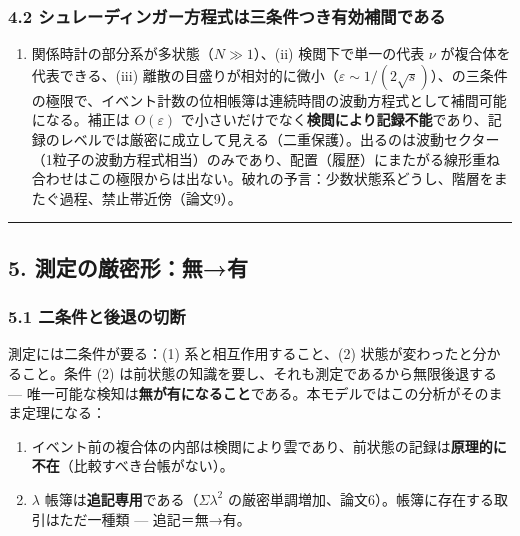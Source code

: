\documentclass[
]{ltjsarticle}
\providecommand{\tightlist}{%
  \setlength{\itemsep}{0pt}\setlength{\parskip}{0pt}}
\begin{document}
\subsubsection{4.2
シュレーディンガー方程式は三条件つき有効補間である}\label{ux30b7ux30e5ux30ecux30fcux30c7ux30a3ux30f3ux30acux30fcux65b9ux7a0bux5f0fux306fux4e09ux6761ux4ef6ux3064ux304dux6709ux52b9ux88dcux9593ux3067ux3042ux308b}

\begin{enumerate}
\def\labelenumi{(\roman{enumi})}
\tightlist
\item
  関係時計の部分系が多状態（\(N\gg1\)）、(ii) 検閲下で単一の代表 \(\nu\)
  が複合体を代表できる、(iii)
  離散の目盛りが相対的に微小（\(\varepsilon\sim1/(2\sqrt s)\)）、の三条件の極限で、イベント計数の位相帳簿は連続時間の波動方程式として補間可能になる。補正は
  \(O(\varepsilon)\)
  で小さいだけでなく\textbf{検閲により記録不能}であり、記録のレベルでは厳密に成立して見える（二重保護）。出るのは波動セクター（1粒子の波動方程式相当）のみであり、配置（履歴）にまたがる線形重ね合わせはこの極限からは出ない。破れの予言：少数状態系どうし、階層をまたぐ過程、禁止帯近傍（論文9）。
\end{enumerate}

\begin{center}\rule{0.5\linewidth}{0.5pt}\end{center}

\subsection{5.
測定の厳密形：無→有}\label{ux6e2cux5b9aux306eux53b3ux5bc6ux5f62ux7121ux6709}

\subsubsection{5.1
二条件と後退の切断}\label{ux4e8cux6761ux4ef6ux3068ux5f8cux9000ux306eux5207ux65ad}

測定には二条件が要る：(1) 系と相互作用すること、(2)
状態が変わったと分かること。条件 (2)
は前状態の知識を要し、それも測定であるから無限後退する ---
唯一可能な検知は\textbf{無が有になること}である。本モデルではこの分析がそのまま定理になる：

\begin{enumerate}
\def\labelenumi{\arabic{enumi}.}
\tightlist
\item
  イベント前の複合体の内部は検閲により雲であり、前状態の記録は\textbf{原理的に不在}（比較すべき台帳がない）。
\item
  \(\lambda\) 帳簿は\textbf{追記専用}である（\(\Sigma\lambda^2\)
  の厳密単調増加、論文6）。帳簿に存在する取引はただ一種類 ---
  追記＝無→有。
\end{enumerate}
\end{document}

